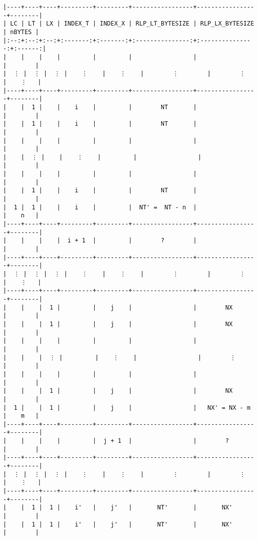 \documentclass[varwidth=\maxdimen,margin=0.5cm,multi={verbatim}]{standalone}
\begin{document}
\begin{verbatim}
|----+----+----+---------+---------+-----------------+-----------------+--------|
| LC | LT | LX | INDEX_T | INDEX_X | RLP_LT_BYTESIZE | RLP_LX_BYTESIZE | nBYTES |
|:--:+:--:+:--:+:-------:+:-------:+:---------------:+:---------------:+:------:|
|    |    |    |         |         |                 |                 |        |
|  ⋮ |  ⋮ |  ⋮ |    ⋮    |    ⋮    |        ⋮        |        ⋮        |    ⋮   |
|----+----+----+---------+---------+-----------------+-----------------+--------|
|    |  1 |    |    i    |         |        NT       |                 |        |
|    |  1 |    |    i    |         |        NT       |                 |        |
|    |    |    |         |         |                 |                 |        |
|    |  ⋮ |    |    ⋮    |         |                 |                 |        |
|    |    |    |         |         |                 |                 |        |
|    |  1 |    |    i    |         |        NT       |                 |        |
|  1 |  1 |    |    i    |         |  NT' =  NT - n  |                 |    n   |
|----+----+----+---------+---------+-----------------+-----------------+--------|
|    |    |    |  i + 1  |         |        ?        |                 |        |
|----+----+----+---------+---------+-----------------+-----------------+--------|
|  ⋮ |  ⋮ |  ⋮ |    ⋮    |    ⋮    |        ⋮        |        ⋮        |    ⋮   |
|----+----+----+---------+---------+-----------------+-----------------+--------|
|    |    |  1 |         |    j    |                 |        NX       |        |
|    |    |  1 |         |    j    |                 |        NX       |        |
|    |    |    |         |         |                 |                 |        |
|    |    |  ⋮ |         |    ⋮    |                 |        ⋮        |        |
|    |    |    |         |         |                 |                 |        |
|    |    |  1 |         |    j    |                 |        NX       |        |
|  1 |    |  1 |         |    j    |                 |   NX' = NX - m  |    m   |
|----+----+----+---------+---------+-----------------+-----------------+--------|
|    |    |    |         |  j + 1  |                 |        ?        |        |
|----+----+----+---------+---------+-----------------+-----------------+--------|
|  ⋮ |  ⋮ |  ⋮ |    ⋮    |    ⋮    |        ⋮        |        ⋮        |    ⋮   |
|----+----+----+---------+---------+-----------------+-----------------+--------|
|    |  1 |  1 |    i'   |    j'   |       NT'       |       NX'       |        |
|    |  1 |  1 |    i'   |    j'   |       NT'       |       NX'       |        |

\end{verbatim}
\end{document}

